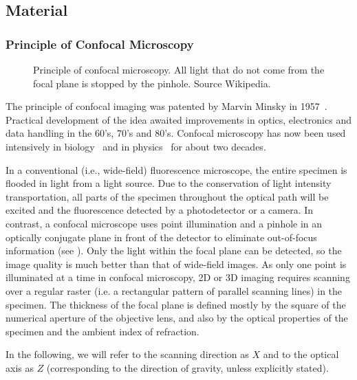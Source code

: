 \subsection{Material}


\subsubsection{Principle of Confocal Microscopy\label{sub:Principle-of-Confocal}}

\begin{figure}
	\centering
	\def\svgwidth{\textwidth}
	\caption{Principle of confocal microscopy. All light that do not come from the focal plane is stopped by the pinhole. Source Wikipedia.}
	\label{fig:Confocal_principle}
\end{figure}

The principle of confocal imaging was patented by Marvin Minsky in 1957~\citep{minsky1957}. Practical development of the idea awaited improvements in optics, electronics and data handling in the 60's, 70's and 80's. Confocal microscopy has now been used intensively in biology~\citep{Pawley2008} and in physics~ \citep{chestnut1997cmc} for about two decades. 

In a conventional (i.e., wide-field) fluorescence microscope, the entire specimen is flooded in light from a light source. Due to the conservation of light intensity transportation, all parts of the specimen throughout the optical path will be excited and the fluorescence detected by a photodetector or a camera. In contrast, a confocal microscope uses point illumination and a pinhole in an optically conjugate plane in front of the detector to eliminate out-of-focus information (see ). Only the light within the focal plane can be detected, so the image quality is much better than that of wide-field images. As only one point is illuminated at a time in confocal microscopy, 2D or 3D imaging requires scanning over a regular raster (i.e. a rectangular pattern of parallel scanning lines) in the specimen. The thickness of the focal plane is defined mostly by the square of the numerical aperture of the objective lens, and also by the optical properties of the specimen and the ambient index of refraction.

In the following, we will refer to the scanning direction as $X$ and to the optical axis as $Z$ (corresponding to the direction of gravity, unless explicitly stated).


